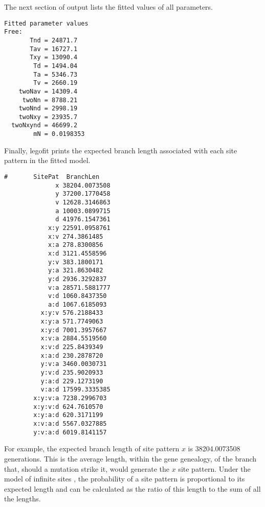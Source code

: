 \documentclass[11pt]{article}
\begin{document}
The next section of output lists the fitted values of all parameters.
\begin{verbatim}
Fitted parameter values
Free:
       Tnd = 24871.7
       Tav = 16727.1
       Txy = 13090.4
        Td = 1494.04
        Ta = 5346.73
        Tv = 2660.19
    twoNav = 14309.4
     twoNn = 8788.21
    twoNnd = 2998.19
    twoNxy = 23935.7
  twoNxynd = 46699.2
        mN = 0.0198353
\end{verbatim}
Finally, legofit prints the expected branch length associated with
each site pattern in the fitted model.
\begin{verbatim}
#       SitePat  BranchLen
              x 38204.0073508
              y 37200.1770458
              v 12628.3146863
              a 10003.0899715
              d 41976.1547361
            x:y 22591.0958761
            x:v 274.3861485
            x:a 278.8300856
            x:d 3121.4558596
            y:v 383.1800171
            y:a 321.8630482
            y:d 2936.3292837
            v:a 28571.5881777
            v:d 1060.8437350
            a:d 1067.6185093
          x:y:v 576.2188433
          x:y:a 571.7749063
          x:y:d 7001.3957667
          x:v:a 2884.5519560
          x:v:d 225.8439349
          x:a:d 230.2878720
          y:v:a 3460.0030731
          y:v:d 235.9020933
          y:a:d 229.1273190
          v:a:d 17599.3335385
        x:y:v:a 7238.2996703
        x:y:v:d 624.7610570
        x:y:a:d 620.3171199
        x:v:a:d 5567.0327885
        y:v:a:d 6019.8141157
\end{verbatim}
For example, the expected branch length of site pattern $x$ is
38204.0073508 generations. This is the average length, within the gene
genealogy, of the branch that, should a mutation strike it, would
generate the $x$ site pattern. Under the model of infinite sites
\citep{Kimura:InfiniteSites}, the probability of a site pattern is
proportional to its expected length and can be calculated as the ratio
of this length to the sum of all the lengths.
\end{document}
